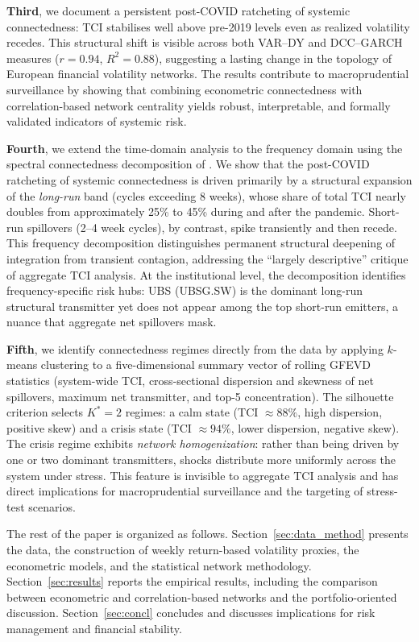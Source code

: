 \textbf{Third}, we document a persistent post-COVID ratcheting of systemic connectedness:
TCI stabilises well above pre-2019 levels even as realized volatility recedes. This
structural shift is visible across both VAR--DY and DCC--GARCH measures ($r = 0.94$,
$R^2 = 0.88$), suggesting a lasting change in the topology of European financial volatility
networks. The results contribute to macroprudential surveillance by showing that
combining econometric connectedness with correlation-based network centrality yields
robust, interpretable, and formally validated indicators of systemic risk.

\textbf{Fourth}, we extend the time-domain analysis to the frequency domain using the
spectral connectedness decomposition of \citet{BarunikKrehlik2018}. We show that the
post-COVID ratcheting of systemic connectedness is driven primarily by a structural
expansion of the \emph{long-run} band (cycles exceeding 8 weeks), whose share of total
TCI nearly doubles from approximately 25\% to 45\% during and after the pandemic.
Short-run spillovers (2--4 week cycles), by contrast, spike transiently and then recede.
This frequency decomposition distinguishes permanent structural deepening of integration
from transient contagion, addressing the ``largely descriptive'' critique of aggregate
TCI analysis. At the institutional level, the decomposition identifies frequency-specific
risk hubs: UBS (UBSG.SW) is the dominant long-run structural transmitter yet does not
appear among the top short-run emitters, a nuance that aggregate net spillovers mask.

\textbf{Fifth}, we identify connectedness regimes directly from the data by applying
$k$-means clustering to a five-dimensional summary vector of rolling GFEVD statistics
(system-wide TCI, cross-sectional dispersion and skewness of net spillovers, maximum
net transmitter, and top-5 concentration). The silhouette criterion selects $K^{*} = 2$
regimes: a calm state (TCI $\approx 88\%$, high dispersion, positive skew) and a crisis
state (TCI $\approx 94\%$, lower dispersion, negative skew). The crisis regime exhibits
\emph{network homogenization}: rather than being driven by one or two dominant
transmitters, shocks distribute more uniformly across the system under stress. This
feature is invisible to aggregate TCI analysis and has direct implications for
macroprudential surveillance and the targeting of stress-test scenarios.


The rest of the paper is organized as follows.
Section~\ref{sec:data_method} presents the data, the construction of weekly return-based
volatility proxies, the econometric models, and the statistical network methodology.
Section~\ref{sec:results} reports the empirical results, including the comparison between
econometric and correlation-based networks and the portfolio-oriented discussion.
Section~\ref{sec:concl} concludes and discusses implications for risk management and
financial stability.
